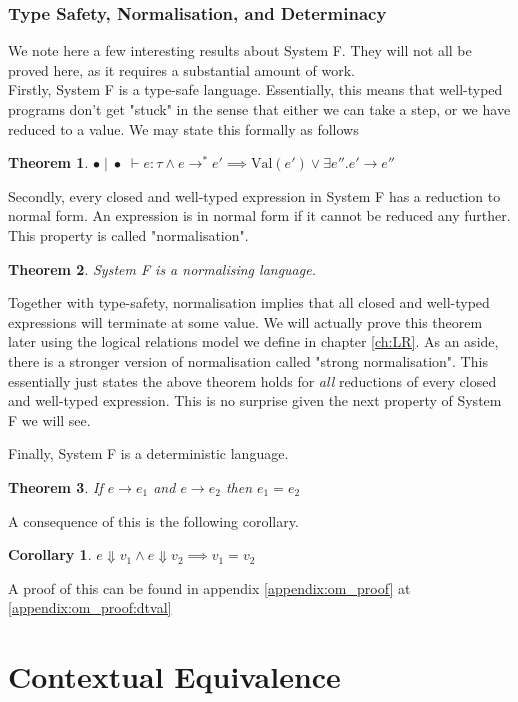 \documentclass[twoside,11pt,openright]{report}
\newtheorem{theorem}{Theorem}
\newtheorem{corollary}{Corollary}[theorem]
\theoremstyle{definition}
\newcommand{\expr}{e}
\newcommand{\val}{v}
\newcommand{\typ}{\tau}
\newcommand{\emptenv}{\bullet}
\newcommand{\empvenv}{\bullet}
\newcommand{\jdg}[4]{#1 \; | \; #2 \; \vdash #3 : #4}
\newcommand{\step}{\rightarrow}
\newcommand{\stepS}{\rightarrow^*}
\newcommand{\Val}[1]{\mathrm{Val}(#1)}
\begin{document}
\subsection{Type Safety, Normalisation, and Determinacy}
We note here a few interesting results about System F. They will not all be proved here, as it requires a substantial amount of work.\\
Firstly, System F is a type-safe language. Essentially, this means that well-typed programs don't get "stuck" in the sense that either we can take a step, or we have reduced to a value. We may state this formally as follows
\begin{theorem}\label{thm:typesafety}
  $\jdg{\emptenv}{\empvenv}{\expr}{\typ} \land \expr \stepS \expr' \implies \Val{\expr'} \lor \exists \expr'' . \expr' \step \expr''$
\end{theorem}
Secondly, every closed and well-typed expression in System F has a reduction to normal form. An expression is in normal form if it cannot be reduced any further. This property is called "normalisation".
\begin{theorem}\label{thm:norm}
  System F is a normalising language.
\end{theorem}
Together with type-safety, normalisation implies that all closed and well-typed expressions will terminate at some value. We will actually prove this theorem later using the logical relations model we define in chapter \ref{ch:LR}. As an aside, there is a stronger version of normalisation called "strong normalisation". This essentially just states the above theorem holds for \textit{all} reductions of every closed and well-typed expression. This is no surprise given the next property of System F we will see.

Finally, System F is a deterministic language.
\begin{theorem}\label{thm:determinacy}
  If $\expr \step \expr_1$ and $\expr \step \expr_2$ then $\expr_1 = \expr_2$
\end{theorem}
A consequence of this is the following corollary.
\begin{corollary}\label{cor:determinacy_val}
  $\expr \Downarrow \val_1 \land \expr \Downarrow \val_2 \implies \val_1 = \val_2$
\end{corollary}
A proof of this can be found in appendix \ref{appendix:om_proof} at \ref{appendix:om_proof:dtval}



\chapter{Contextual Equivalence}
\label{ch:CE}
\end{document}
